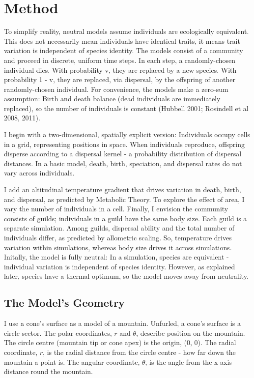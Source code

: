 \documentclass[11pt]{article}
\begin{document}
\section{Method}
To simplify reality, neutral models assume individuals are ecologically equivalent. This does not necessarily mean individuals have identical traits, it means trait variation is independent of species identity. The models consist of a community and proceed in discrete, uniform time steps. In each step, a randomly-chosen individual dies. With probability v, they are replaced by a new species. With probability 1 - v, they are replaced, via dispersal, by the offspring of another randomly-chosen individual. For convenience, the models make a zero-sum assumption: Birth and death balance (dead individuals are immediately replaced), so the number of individuals is constant (Hubbell 2001; Rosindell et al 2008, 2011).

I begin with a two-dimensional, spatially explicit version: Individuals occupy cells in a grid, representing positions in space. When individuals reproduce, offspring disperse according to a dispersal kernel - a probability distribution of dispersal distances. In a basic model, death, birth, speciation, and dispersal rates do not vary across individuals.

I add an altitudinal temperature gradient that drives variation in death, birth, and dispersal, as predicted by Metabolic Theory. To explore the effect of area, I vary the number of individuals in a cell. Finally, I envision the community consists of guilds; individuals in a guild have the same body size. Each guild is a separate simulation. Among guilds, dispersal ability and the total number of individuals differ, as predicted by allometric scaling. So, temperature drives variation within simulations, whereas body size drives it across simulations. Initally, the model is fully neutral: In a simulation, species are equivalent - individual variation is independent of species identity. However, as explained later, species have a thermal optimum, so the model moves away from neutrality.

\subsection{The Model's Geometry}
I use a cone's surface as a model of a mountain. Unfurled, a cone's surface is a circle sector. The polar coordinates, $r$ and $\theta$, describe position on the mountain. The circle centre (mountain tip or cone apex) is the origin, (0, 0). The radial coordinate, $r$, is the radial distance from the circle centre - how far down the mountain a point is. The angular coordinate, $\theta$, is the angle from the x-axis - distance round the mountain.
\end{document}
